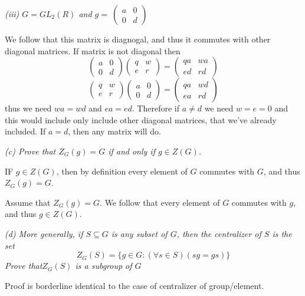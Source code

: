 \documentclass[11pt,oneside,titlepage]{book}
\newcommand{\set}[1]{\{ #1 \}}
\begin{document}
\textit{(iii) $G = GL_2(R)$ and $g = \
  \begin{pmatrix}
    a & 0 \\
    0 & d
  \end{pmatrix}
  $
}

We follow that this matrix is diagnogal, and thus it commutes with other
diagonal matrices. If matrix is not diagonal then
$$
  \begin{pmatrix}
    a & 0 \\
    0 & d
  \end{pmatrix}
  \begin{pmatrix}
    q & w \\
    e & r
  \end{pmatrix} =
  \begin{pmatrix}
    qa & wa \\
    ed & rd
  \end{pmatrix}
  $$
  $$
  \begin{pmatrix}
    q & w \\
    e & r
  \end{pmatrix}
  \begin{pmatrix}
    a & 0 \\
    0 & d
  \end{pmatrix} =
  \begin{pmatrix}
    qa & wd \\
    ea & rd
  \end{pmatrix}
  $$
  thus we need $wa = wd$ and $ea = ed$. Therefore if $a \neq d$ we
need $w = e = 0$ and this would include only include other diagonal
matrices, that we've already included. If $a = d$, then any matrix
will do.

\textit{(c) Prove that $Z_G(g) = G$ if and only if $g \in Z(G)$.}

IF $g \in Z(G)$, then by definition every element of $G$ commutes
with $G$, and thus $Z_G(g) = G$.

Assume that $Z_G(g) = G$. We follow that every element of $G$ commutes
with $g$, and thus $g \in Z(G)$.

\textit{(d) More generally, if $S \subseteq G$ is any subset of $G$,
then the centralizer of $S$ is the set
  $$Z_G(S) = \set{g \in G: (\forall s \in S)(sg = gs)}$$
  Prove that$ Z_G(S)$ is a subgroup of $G$ }

Proof is borderline identical to the case of centralizer of
group/element.

\subsection{}
\end{document}
